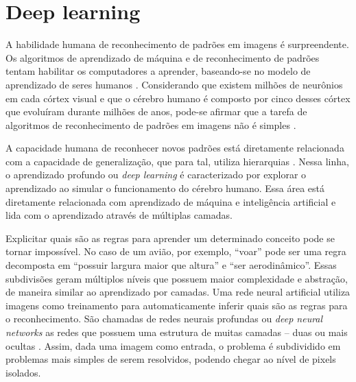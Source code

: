 \section{Deep learning}
\label{sec:deeplearning}



A habilidade humana de reconhecimento de padrões em imagens é surpreendente. Os algoritmos de aprendizado de máquina e de reconhecimento de padrões tentam habilitar os computadores a aprender, baseando-se no modelo de aprendizado de seres humanos \cite{thesisDeep}. Considerando que existem milhões de neurônios em cada córtex visual e que o cérebro humano é composto por cinco desses córtex que evoluíram durante milhões de anos, pode-se afirmar que a tarefa de algoritmos de reconhecimento de padrões em imagens não é simples \cite{neuralNielsen}.

A capacidade humana de reconhecer novos padrões está diretamente relacionada com a capacidade de generalização, que para tal, utiliza hierarquias \cite{thesisDeep}. Nessa linha, o aprendizado profundo ou \textit{deep learning} é caracterizado por explorar o aprendizado ao simular o funcionamento do cérebro humano. Essa área está diretamente relacionada com aprendizado de máquina e inteligência artificial e lida com o aprendizado através de múltiplas camadas.

Explicitar quais são as regras para aprender um determinado conceito pode se tornar impossível. No caso de um avião, por exemplo, ``voar'' pode ser uma regra decomposta em ``possuir largura maior que altura'' e ``ser aerodinâmico''. Essas subdivisões geram múltiplos níveis que possuem maior complexidade e abstração, de maneira similar ao aprendizado por camadas. Uma rede neural artificial utiliza imagens como treinamento para automaticamente inferir quais são as regras para o reconhecimento. São chamadas de redes neurais profundas ou \textit{deep neural networks} as redes que possuem uma estrutura de muitas camadas -- duas ou mais ocultas \cite{neuralNielsen}. Assim, dada uma imagem como entrada, o problema é subdividido em problemas mais simples de serem resolvidos, podendo chegar ao nível de pixels isolados.

